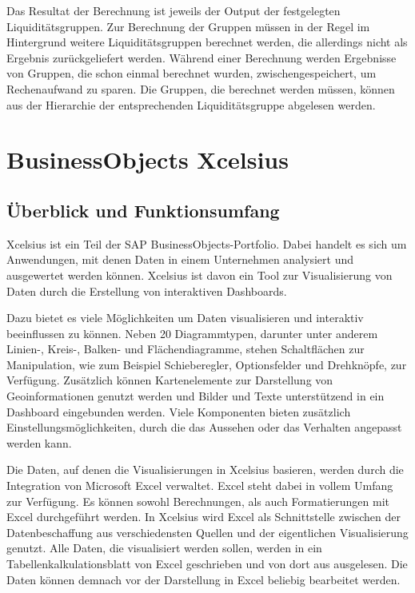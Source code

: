 \begin{onehalfspacing}
Das Resultat der Berechnung ist jeweils der Output der festgelegten Liquiditätsgruppen. Zur Berechnung der Gruppen müssen in der Regel im Hintergrund weitere Liquiditätsgruppen berechnet werden, die allerdings nicht als Ergebnis zurückgeliefert werden. Während einer Berechnung werden Ergebnisse von Gruppen, die schon einmal berechnet wurden, zwischengespeichert, um Rechenaufwand zu sparen. Die Gruppen, die berechnet werden müssen, können aus der Hierarchie der entsprechenden Liquiditätsgruppe abgelesen werden.

\section{BusinessObjects Xcelsius}
\label{sec:xcelsius}
\subsection{Überblick und Funktionsumfang} 
\gls{Xcelsius} ist ein Teil der SAP BusinessObjects-Portfolio. Dabei handelt es sich um Anwendungen, mit denen Daten in einem Unternehmen analysiert und ausgewertet werden können. \gls{Xcelsius} ist davon ein Tool zur Visualisierung von Daten durch die Erstellung von interaktiven Dashboards.

Dazu bietet es viele Möglichkeiten um Daten visualisieren und interaktiv beeinflussen zu können. Neben 20 Diagrammtypen, darunter unter anderem Linien-, Kreis-, Balken-  und Flächendiagramme, stehen Schaltflächen zur Manipulation, wie zum Beispiel Schieberegler, Optionsfelder und Drehknöpfe, zur Verfügung. Zusätzlich können Kartenelemente zur Darstellung von Geoinformationen genutzt werden und Bilder und Texte unterstützend in ein Dashboard eingebunden werden. Viele Komponenten bieten zusätzlich Einstellungsmöglichkeiten, durch die das Aussehen oder das Verhalten angepasst werden kann.

Die Daten, auf denen die Visualisierungen in \gls{Xcelsius} basieren, werden durch die Integration von Microsoft Excel verwaltet. Excel steht dabei in vollem Umfang zur Verfügung. Es können sowohl  Berechnungen, als auch Formatierungen mit Excel durchgeführt werden. In \gls{Xcelsius} wird Excel als Schnittstelle zwischen der Datenbeschaffung aus verschiedensten Quellen und der eigentlichen Visualisierung genutzt. Alle Daten, die visualisiert werden sollen, werden in ein Tabellenkalkulationsblatt von Excel geschrieben und von dort aus ausgelesen. Die Daten können demnach vor der Darstellung in Excel beliebig bearbeitet werden. 


\end{onehalfspacing}
